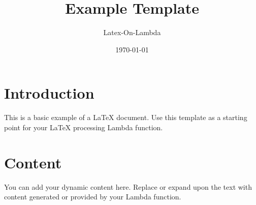 \documentclass{article}
\title{Example Template}
\author{Latex-On-Lambda}
\date{\today}
\begin{document}
\maketitle

\section{Introduction}
This is a basic example of a LaTeX document. Use this template as a starting point for your LaTeX processing Lambda function.

\section{Content}
You can add your dynamic content here. Replace or expand upon the text with content generated or provided by your Lambda function.
\end{document}
